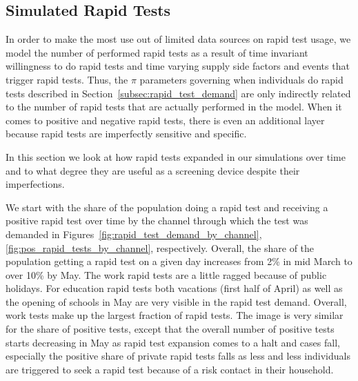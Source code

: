 \subsection{Simulated Rapid Tests}
\label{subsec:results_rapid_test_statistics}

In order to make the most use out of limited data sources on rapid test usage, we model
the number of performed rapid tests as a result of time invariant willingness to do
rapid tests and time varying supply side factors and events that trigger rapid tests.
Thus, the $\pi$ parameters governing when individuals do rapid tests described in
Section~\ref{subsec:rapid_test_demand} are only indirectly related to the number of
rapid tests that are actually performed in the model. When it comes to positive and
negative rapid tests, there is even an additional layer because rapid tests are
imperfectly sensitive and specific.

In this section we look at how rapid tests expanded in our simulations over time and to
what degree they are useful as a screening device despite their imperfections.

We start with the share of the population doing a rapid test and receiving a positive
rapid test over time by the channel through which the test was demanded in
Figures~\ref{fig:rapid_test_demand_by_channel}, \ref{fig:pos_rapid_tests_by_channel},
respectively. Overall, the share of the population getting a rapid test on a given day
increases from 2\% in mid March to over 10\% by May. The work rapid tests are a little
ragged because of public holidays. For education rapid tests both vacations (first half
of April) as well as the opening of schools in May are very visible in the rapid test
demand. Overall, work tests make up the largest fraction of rapid tests. The image is
very similar for the share of positive tests, except that the overall number of positive
tests starts decreasing in May as rapid test expansion comes to a halt and cases fall,
especially the positive share of private rapid tests falls as less and less individuals
are triggered to seek a rapid test because of a risk contact in their household.

